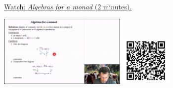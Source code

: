 
\begin{minipage}{10cm}
    \href{https://act4e-spring21.netlify.app/videos/spring2021-monads-b:algebra-monad.html}{Watch: \emph{Algebras for a monad} (2 minutes).}
        
    \href{https://act4e-spring21.netlify.app/videos/spring2021-monads-b:algebra-monad.html}{\includegraphics[height=3.5cm]{spring2021-monads-b:algebra-monad/thumbnails.jpg}}
    \href{https://act4e-spring21.netlify.app/videos/spring2021-monads-b:algebra-monad.html}{\includegraphics[height=2.5cm]{spring2021-monads-b:algebra-monad/qrcode.png}}
\end{minipage}

